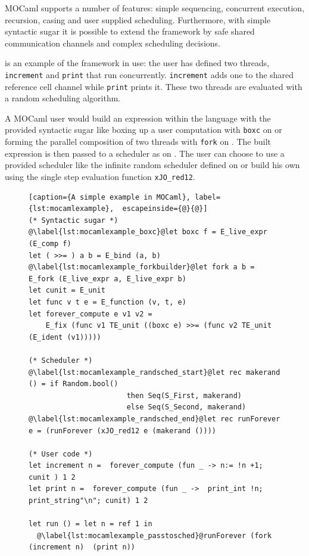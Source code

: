 \documentclass[12pt,twoside,notitlepage]{report}
\begin{document}
MOCaml supports a number of features: simple sequencing, concurrent execution, recursion, casing and user supplied scheduling. Furthermore, with simple syntactic sugar it is possible to extend the framework by safe shared communication channels and complex scheduling decisions. 

 is an example of the framework in use:  the user has defined two threads, \lstinline|increment| and \lstinline|print| that run concurrently.   \lstinline|increment| adds one to the shared reference cell channel while \lstinline|print| prints it. These two threads are evaluated with a random scheduling algorithm.

A MOCaml user would build an expression within the language with the provided syntactic sugar like boxing up a user computation with \lstinline|boxc| on  or forming the parallel composition of two threads with \lstinline|fork| on . The built expression is then passed to a scheduler as on . The user can choose to use a provided scheduler like the infinite random scheduler defined on  or build his own using the single step evaluation function \lstinline|xJO_red12|.
\begin{figure}[H]
\centering
\begin{lstlisting}[caption={A simple example in MOCaml}, label={lst:mocamlexample},  escapeinside={@}{@}]
(* Syntactic sugar *)
@\label{lst:mocamlexample_boxc}@let boxc f = E_live_expr (E_comp f)
let ( >>= ) a b = E_bind (a, b)
@\label{lst:mocamlexample_forkbuilder}@let fork a b = E_fork (E_live_expr a, E_live_expr b)
let cunit = E_unit
let func v t e = E_function (v, t, e)
let forever_compute e v1 v2 = 
    E_fix (func v1 TE_unit ((boxc e) >>= (func v2 TE_unit (E_ident (v1)))))

(* Scheduler *)
@\label{lst:mocamlexample_randsched_start}@let rec makerand () = if Random.bool() 
                       then Seq(S_First, makerand) 
                       else Seq(S_Second, makerand)
@\label{lst:mocamlexample_randsched_end}@let rec runForever e = (runForever (xJO_red12 e (makerand ())))

(* User code *)
let increment n =  forever_compute (fun _ -> n:= !n +1; cunit ) 1 2
let print n =  forever_compute (fun _ ->  print_int !n; print_string"\n"; cunit) 1 2 

let run () = let n = ref 1 in
  @\label{lst:mocamlexample_passtosched}@runForever (fork (increment n)  (print n))
\end{lstlisting}
\end{figure}
\end{document}
